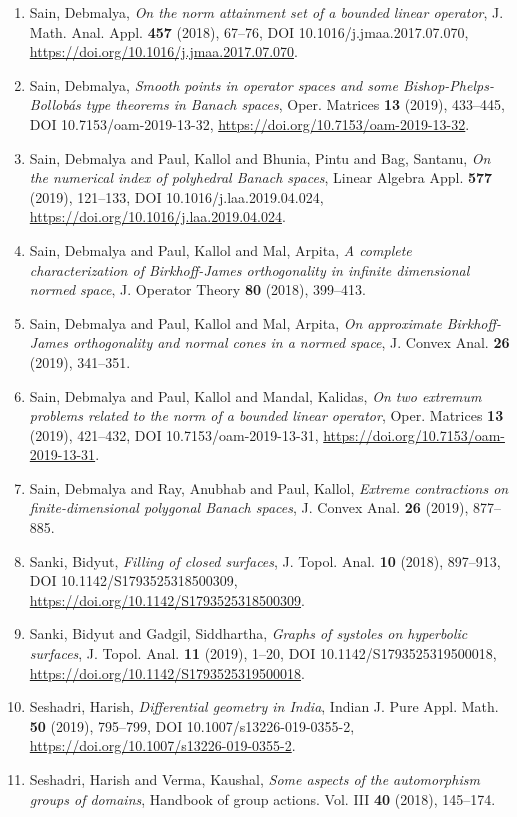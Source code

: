 \begin{enumerate}
\item Sain, Debmalya, {\em On the norm attainment set of a bounded linear operator}, J. Math. Anal. Appl. {\bf 457} (2018), 67--76, DOI 10.1016/j.jmaa.2017.07.070, \url{https://doi.org/10.1016/j.jmaa.2017.07.070}.
\item Sain, Debmalya, {\em Smooth points in operator spaces and some
{B}ishop-{P}helps-{B}ollob\'{a}s type theorems in {B}anach spaces}, Oper. Matrices {\bf 13} (2019), 433--445, DOI 10.7153/oam-2019-13-32, \url{https://doi.org/10.7153/oam-2019-13-32}.
\item Sain, Debmalya and Paul, Kallol and Bhunia, Pintu and Bag,
Santanu, {\em On the numerical index of polyhedral {B}anach spaces}, Linear Algebra Appl. {\bf 577} (2019), 121--133, DOI 10.1016/j.laa.2019.04.024, \url{https://doi.org/10.1016/j.laa.2019.04.024}.
\item Sain, Debmalya and Paul, Kallol and Mal, Arpita, {\em A complete characterization of {B}irkhoff-{J}ames
orthogonality in infinite dimensional normed space}, J. Operator Theory {\bf 80} (2018), 399--413.
\item Sain, Debmalya and Paul, Kallol and Mal, Arpita, {\em On approximate {B}irkhoff-{J}ames orthogonality and normal
cones in a normed space}, J. Convex Anal. {\bf 26} (2019), 341--351.
\item Sain, Debmalya and Paul, Kallol and Mandal, Kalidas, {\em On two extremum problems related to the norm of a bounded
linear operator}, Oper. Matrices {\bf 13} (2019), 421--432, DOI 10.7153/oam-2019-13-31, \url{https://doi.org/10.7153/oam-2019-13-31}.
\item Sain, Debmalya and Ray, Anubhab and Paul, Kallol, {\em Extreme contractions on finite-dimensional polygonal {B}anach
spaces}, J. Convex Anal. {\bf 26} (2019), 877--885.
\item Sanki, Bidyut, {\em Filling of closed surfaces}, J. Topol. Anal. {\bf 10} (2018), 897--913, DOI 10.1142/S1793525318500309, \url{https://doi.org/10.1142/S1793525318500309}.
\item Sanki, Bidyut and Gadgil, Siddhartha, {\em Graphs of systoles on hyperbolic surfaces}, J. Topol. Anal. {\bf 11} (2019), 1--20, DOI 10.1142/S1793525319500018, \url{https://doi.org/10.1142/S1793525319500018}.
\item Seshadri, Harish, {\em Differential geometry in {I}ndia}, Indian J. Pure Appl. Math. {\bf 50} (2019), 795--799, DOI 10.1007/s13226-019-0355-2, \url{https://doi.org/10.1007/s13226-019-0355-2}.
\item Seshadri, Harish and Verma, Kaushal, {\em Some aspects of the automorphism groups of domains}, Handbook of group actions. {V}ol. {III} {\bf 40} (2018), 145--174.

\end{enumerate}

